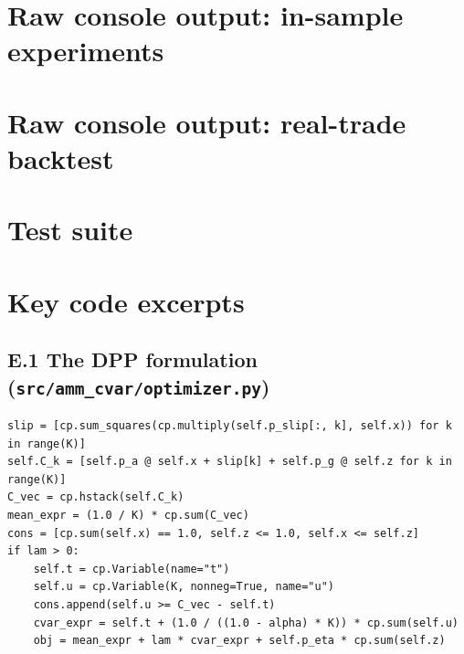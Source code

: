 \documentclass[11pt,a4paper]{article}
\theoremstyle{remark}
\newcommand{\cvar}{\texorpdfstring{\ensuremath{\mathrm{CVaR}}}{CVaR}}
\newcommand{\code}[1]{\texttt{#1}}
\begin{document}
\section{Raw console output: in-sample experiments}
\label{app:log03}


\section{Raw console output: real-trade backtest}
\label{app:log04}


\section{Test suite}
\label{app:tests}


\section{Key code excerpts}
\label{app:code}

\subsection*{E.1 The DPP formulation (\code{src/amm\_cvar/optimizer.py})}
\begin{lstlisting}[style=pystyle]
slip = [cp.sum_squares(cp.multiply(self.p_slip[:, k], self.x)) for k in range(K)]
self.C_k = [self.p_a @ self.x + slip[k] + self.p_g @ self.z for k in range(K)]
C_vec = cp.hstack(self.C_k)
mean_expr = (1.0 / K) * cp.sum(C_vec)
cons = [cp.sum(self.x) == 1.0, self.z <= 1.0, self.x <= self.z]
if lam > 0:
    self.t = cp.Variable(name="t")
    self.u = cp.Variable(K, nonneg=True, name="u")
    cons.append(self.u >= C_vec - self.t)
    cvar_expr = self.t + (1.0 / ((1.0 - alpha) * K)) * cp.sum(self.u)
    obj = mean_expr + lam * cvar_expr + self.p_eta * cp.sum(self.z)
\end{lstlisting}
\end{document}
